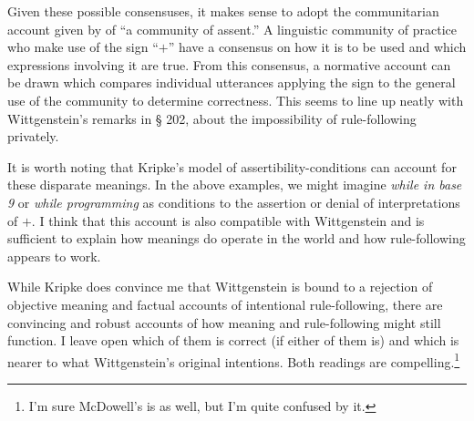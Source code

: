 \documentclass[man,12pt,natbib]{apa6}
\begin{document}
Given these possible consensuses, it makes sense to adopt the communitarian
account given by \citet{Wright01} of ``a community of assent.'' A linguistic
community of practice who make use of the sign ``$+$'' have a consensus on how
it is to be used and which expressions involving it are true. From this
consensus, a normative account can be drawn which compares individual
utterances applying the sign to the general use of the community to determine
correctness. This seems to line up neatly with Wittgenstein's remarks in \S
202, about the impossibility of rule-following privately.

It is worth noting that Kripke's model of assertibility-conditions can account
for these disparate meanings. In the above examples, we might imagine
\emph{while in base 9} or \emph{while programming} as conditions to the
assertion or denial of interpretations of $+$. I think that this account is
also compatible with Wittgenstein and is sufficient to explain how meanings do
operate in the world and how rule-following appears to work. 

While Kripke does convince me that Wittgenstein is bound to a rejection of
objective meaning and factual accounts of intentional rule-following, there are
convincing and robust accounts of how meaning and rule-following might still
function. I leave open which of them is correct (if either of them is) and
which is nearer to what Wittgenstein's original intentions. Both readings are
compelling.\footnote{I'm sure McDowell's is as well, but I'm quite confused by
it.}

\clearpage

\end{document}
